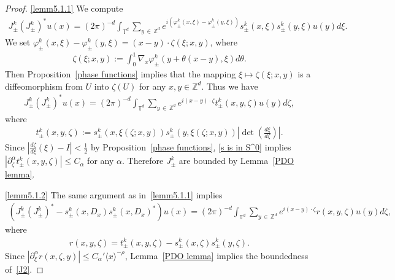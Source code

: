 \documentclass[AHL,Unicode,longabstracts,published]{cedram}
\renewcommand{\a}{\alpha}
\newcommand{\f}{\varphi}
\newcommand{\z}{\zeta}
\newcommand{\x}{\xi}
\newcommand{\Z}{\mathbb{Z}}
\newcommand{\T}{\mathbb{T}}
\newcommand{\la}{\langle}
\newcommand{\ra}{\rangle}
\newcommand{\Z}{\mathbb{Z}}
\begin{document}
\begin{proof}
\eqref{lemm5.1.1} We compute
\begin{align*}
J_\pm^k \left(J_\pm^k\right)^* u(x) = (2\pi)^{-d} \int_{\T^d} \sum_{y\,\in\,\Z^d} e^{i\left(\f_{\pm}^k(x,\x)-\f_{\pm}^k(y,\x)\right)} s_\pm^k(x,\x) s_\pm^k(y,\x) u(y) d\x.
\end{align*}
We set $\f_{\pm}^k(x,\x)-\f_{\pm}^k(y,\x) = (x-y) \cdot \z(\x;x,y)$, where
\begin{align*}
\z(\x;x,y) := \int_0^1 \nabla_x \f_{\pm}^k(y+\theta(x-y),\x) d\theta.
\end{align*}
Then Proposition~\ref{phase functions} implies that the mapping $\x \mapsto \z(\x;x,y)$ is a diffeomorphism from $U$ into $\z(U)$ for any $x,y \in \Z^d$. Thus we have
\begin{align*}
J_\pm^k \left(J_\pm^k\right)^* u(x) = (2\pi)^{-d} \int_{\T^d} \sum_{y\,\in\,\Z^d} e^{i(x-y)\cdot\z} t_\pm^k(x,y,\z) u(y) d\z,
\end{align*}
where
\begin{align*}
t_\pm^k(x,y,\z):=s_\pm^k(x,\x(\z;x,y)) s_\pm^k(y,\x(\z;x,y)) \left|\det\left(\frac{d\x}{d\z} \right)\right|.
\end{align*}
Since $|\frac{d\z}{d\x}(\x) - I| < \frac{1}{2}$ by Proposition~\ref{phase functions}, \eqref{s is in S^0} implies $|\partial_{\z}^\a t_\pm^k(x,y,\z)|\leq C_\a$ for any $\a$. Therefore $J_\pm^k$ are bounded by Lemma~\ref{PDO lemma}.


\eqref{lemm5.1.2} The same argument as in~\eqref{lemm5.1.1} implies
\begin{align*}
\left(J_\pm^k \left(J_\pm^k\right)^* - s_\pm^k(x,D_x) s_\pm^k(x,D_x)^* \right) u(x) 
= (2\pi)^{-d} \int_{\T^d} \sum_{y\,\in\,\Z^d} e^{i(x-y)\cdot\z} r(x,y,\z) u(y) d\z,
\end{align*}
where
\begin{align*}
r(x,y,\z)=t_\pm^k(x,y,\z) - s_\pm^k(x,\z) s_\pm^k(y,\z).
\end{align*}
Since $|\partial_\x^\a r(x,\z,y)| \leq C_\a' \la x \ra^{-\rho}$, Lemma~\ref{PDO lemma} implies the boundedness of~\eqref{J2}.


\end{proof}
\end{document}
